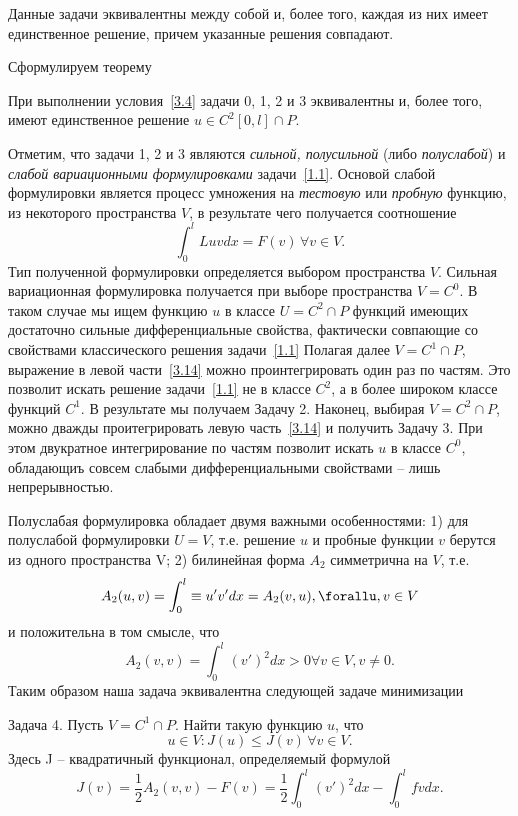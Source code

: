 \documentclass[11pt]{article}
\begin{document}
    Данные задачи эквивалентны между собой и, более того, каждая из них имеет единственное решение, причем указанные решения совпадают.

    Сформулируем теорему
\begin{theorem}
    При выполнении условия~\ref{3.4} задачи 0, 1, 2 и 3 эквивалентны и, более того, имеют единственное решение $u \in C^2 [0,l] \cap P$.
\end{theorem}
    Отметим, что задачи 1, 2 и 3 являются \textit{сильной, полусильной} (либо \textit{полуслабой}) и \textit{слабой вариационными формулировками} задачи~\ref{1.1}.
    Основой слабой формулировки является процесс умножения на \textit{тестовую} или \textit{пробную} функцию, из некоторого пространства $V$, в результате чего получается соотношение
    \begin{equation}
        \label{3.14}
        \int_0^l Luvdx =F(v) \, \forall v \in V.
    \end{equation}
    Тип полученной формулировки определяется выбором пространства $V$.
    Сильная вариационная формулировка получается при выборе пространства $V = C^0$.
    В таком случае мы ищем функцию $u$ в классе $U = C^2 \cap P$ функций имеющих достаточно сильные дифференциальные свойства, фактически совпающие со свойствами классического решения задачи~\eqref{1.1}
    Полагая далее $V = C^1 \cap P$, выражение в левой части~\eqref{3.14} можно проинтегрировать один раз по частям.
    Это позволит искать решение задачи~\eqref{1.1} не в классе $C^2$, а в более широком классе функций $C^1$.
    В результате мы получаем Задачу 2.
    Наконец, выбирая $V = C^2 \cap P$, можно дважды проитегрировать левую часть~\eqref{3.14} и получить Задачу 3.
    При этом двукратное интегрирование по частям позволит искать $u$ в классе $C^0$, обладающиъ совсем слабыми дифференциальными свойствами -- лишь непрерывностью.

    Полуслабая формулировка обладает двумя важными особенностями:
    1) для полуслабой формулировки $U = V$, т.е. решение $u$ и пробные функции $v$ берутся из одного пространства V;
    2) билинейная форма $A_2$ симметрична на $V$, т.е.
    \[ A_2(u,v) = \int_0^l \equiv u' v' dx = A_2(v,u), \forallu,v \in V \]
    и положительна в том смысле, что
    \[ A_2(v,v) = \int_0^l (v')^2 dx > 0 \forall v \in V, v \neq 0. \]
    Таким образом наша задача эквивалентна следующей задаче минимизации

    Задача 4. Пусть $V = C^1 \cap P$. Найти такую функцию $u$, что
    \[ u \in V : J (u) \leq J(v) \, \forall v \in V. \]
    Здесь J -- квадратичный функционал, определяемый формулой
    \[ J(v) = \frac{1}{2} A_2(v,v)-F(v)=\frac{1}{2} \int_0^l (v')^2 dx-\int_0^l f v dx. \]
    
\end{document}
